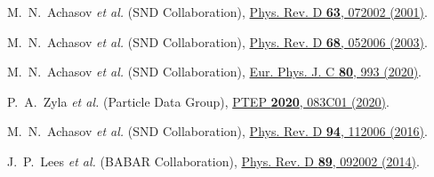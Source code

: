 \documentclass[twocolumn,aps,prd,floatfix,nofootinbib,superscriptaddress]{revtex4-2}
\begin{document}
\begin{thebibliography}{9}


M.~N.~Achasov \textit{et al.} (SND Collaboration),
\href{https://doi.org/10.1103/PhysRevD.63.072002}
{Phys. Rev. D \textbf{63}, 072002 (2001)}.

M.~N.~Achasov \textit{et al.} (SND Collaboration),
\href{https://doi.org/10.1103/PhysRevD.68.052006}
{Phys. Rev. D \textbf{68}, 052006 (2003)}.

M.~N.~Achasov \textit{et al.} (SND Collaboration),
\href{https://doi.org/10.1140/epjc/s10052-020-08524-4}
{Eur. Phys. J. C \textbf{80}, 993 (2020)}.

P.~A.~Zyla \textit{et al.} (Particle Data Group),
\href{https://doi.org/10.1093/ptep/ptaa104}
{PTEP \textbf{2020}, 083C01 (2020)}.

M.~N.~Achasov \textit{et al.} (SND Collaboration),
\href{https://doi.org/10.1103/PhysRevD.94.112006}
{Phys. Rev. D \textbf{94}, 112006 (2016)}.

J.~P.~Lees \textit{et al.} (BABAR Collaboration),
\href{https://doi.org/10.1103/PhysRevD.89.092002}
{Phys. Rev. D \textbf{89}, 092002 (2014)}.



\end{thebibliography}
\end{document}
